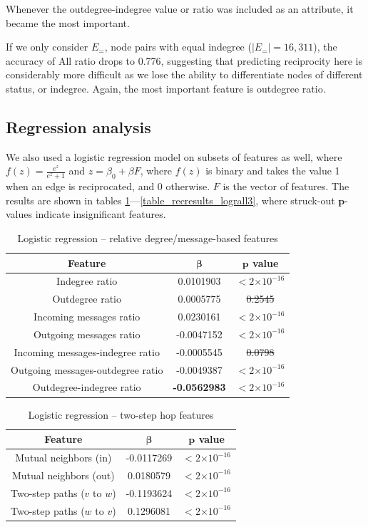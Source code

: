 \documentclass[conference]{IEEEtran}
\providecommand{\e}[1]{\ensuremath{\times 10^{#1}}}
\begin{document}
Whenever the outdegree-indegree value or ratio was included as an attribute, it became the most important.

If we only consider $E_=$, node pairs with equal indegree ($|E_=|=16,311$), the accuracy of All ratio drops to 0.776, suggesting that predicting reciprocity here is considerably more difficult as we lose the ability to differentiate nodes of different status, or indegree. Again, the most important feature is outdegree ratio.

\subsection{Regression analysis}
We also used a logistic regression model on subsets of features as well, where $f(z) = \frac{e^z}{e^z+1}$ and $z = \beta_0 + \beta F$, where $f(z)$ is binary and takes the value 1 when an edge is reciprocated, and 0 otherwise. $F$ is the vector of features.
The results are shown in 
tables \ref{table_recresults_logr}---\ref{table_recresults_lograll3}, where struck-out $\mathbf{p}$-values indicate insignificant features.


\begin{table}[!t]
\renewcommand{\arraystretch}{1.3}
\caption{Logistic regression -- relative degree/message-based features}
\label{table_recresults_logr}
\centering
\begin{tabular}{|c||c|c|}
\hline
\bf{Feature} & $\mathbf{\beta}$ & $\mathbf{p}$ value \\
\hline
Indegree ratio & 0.0101903 & $< 2 \e{-16} $ \\
Outdegree ratio & 0.0005775 & \sout{0.2545} \\
Incoming messages ratio & 0.0230161 & $< 2 \e{-16} $ \\
Outgoing messages ratio & -0.0047152 & $< 2 \e{-16} $ \\
Incoming messages-indegree ratio & -0.0005545 & \sout{0.0798} \\
Outgoing messages-outdegree ratio & -0.0049387 & $< 2 \e{-16} $ \\
Outdegree-indegree ratio & \bf{-0.0562983} & $< 2 \e{-16} $ \\
\hline
\end{tabular}
\end{table}

\begin{table}[!t]
\renewcommand{\arraystretch}{1.3}
\caption{Logistic regression -- two-step hop features}
\label{table_recresults_logrpath}
\centering
\begin{tabular}{|c||c|c|}
\hline
\bf{Feature} & $\mathbf{\beta}$ & $\mathbf{p}$ value \\
\hline
Mutual neighbors (in) & -0.0117269 & $< 2 \e{-16} $ \\
Mutual neighbors (out) & 0.0180579 & $< 2 \e{-16} $ \\
Two-step paths ($v$ to $w$) & -0.1193624 & $< 2 \e{-16} $ \\
Two-step paths ($w$ to $v$) & 0.1296081 & $< 2 \e{-16} $ \\
\hline
\end{tabular}
\end{table}
\end{document}
